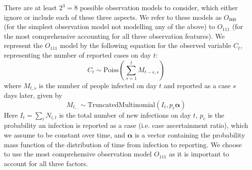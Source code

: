 \documentclass{article}
\begin{document}
\begin{enumerate}
There are at least  $2^3=8$ possible observation models to consider, which either ignore or include each of these three aspects.
We refer to these models as $O_{000}$ (for the simplest observation model not modelling any of the above) to $O_{111}$ (for the most comprehensive accounting for all three observation features). We represent the $O_{111}$ model by the following equation for the observed variable $C_t$, representing the number of reported cases on day $t$:
\begin{equation} \label{eq:cases}
    C_t \sim \mathrm{Poiss}\left( \sum_{s=1}^t M_{t-s,s}\right)
\end{equation}
where $M_{t,s}$ is the number of people infected on day $t$ and reported as a case $s$ days later, given by
\begin{equation}
    M_{t,.} \sim \mathrm{TruncatedMultinomial}\left( I_t, p_c \boldsymbol{\alpha} \right) 
\end{equation}
Here $I_t=\sum_i N_{i,t}$ is the total number of new infections on day $t$, $p_c$ is the probability an infection is reported as a case (i.e. case ascertainment ratio), which we assume to be constant over time, and $\boldsymbol{\alpha}$ is a vector containing the probability mass function of the distribution of time from infection to reporting. We choose to use the most comprehensive observation model $O_{111}$ as it is important to account for all three factors.




\end{enumerate}
\end{document}
